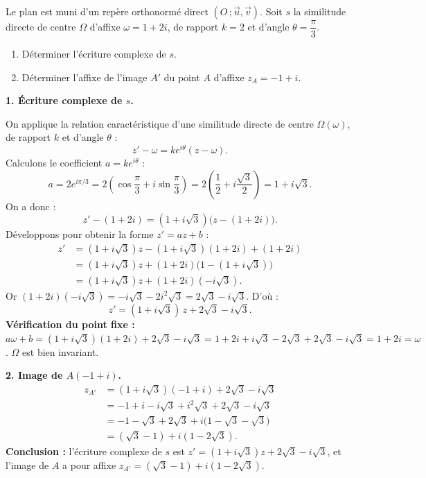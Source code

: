 \documentclass[11pt]{article}
\begin{document}
\begin{exoresolu}
Le plan est muni d'un repère orthonormé direct $(O\,;\vec{u},\vec{v})$. Soit $s$ la similitude directe de centre $\Omega$ d'affixe $\omega = 1 + 2i$, de rapport $k = 2$ et d'angle $\theta = \dfrac{\pi}{3}$.
\begin{enumerate}
\item Déterminer l'écriture complexe de $s$.
\item Déterminer l'affixe de l'image $A'$ du point $A$ d'affixe $z_A = -1 + i$.
\end{enumerate}
\tcblower
\textbf{1. Écriture complexe de $s$.}

On applique la relation caractéristique d'une similitude directe de centre $\Omega(\omega)$, de rapport $k$ et d'angle $\theta$ :
\[ z' - \omega = k e^{i\theta}(z - \omega). \]
Calculons le coefficient $a = k e^{i\theta}$ :
\[ a = 2 e^{i\pi/3} = 2\left(\cos\frac{\pi}{3} + i\sin\frac{\pi}{3}\right) = 2\left(\frac{1}{2} + i\frac{\sqrt{3}}{2}\right) = 1 + i\sqrt{3}. \]
On a donc :
\[ z' - (1 + 2i) = (1 + i\sqrt{3})\bigl(z - (1+2i)\bigr). \]
Développons pour obtenir la forme $z' = az + b$ :
\begin{align*}
z' &= (1 + i\sqrt{3})z - (1+i\sqrt{3})(1+2i) + (1+2i) \\
&= (1 + i\sqrt{3})z + (1+2i)\bigl(1 - (1+i\sqrt{3})\bigr) \\
&= (1 + i\sqrt{3})z + (1+2i)(-i\sqrt{3}).
\end{align*}
Or $(1+2i)(-i\sqrt{3}) = -i\sqrt{3} - 2i^2\sqrt{3} = 2\sqrt{3} - i\sqrt{3}$. D'où :
\[ \boxed{z' = (1 + i\sqrt{3})\,z + 2\sqrt{3} - i\sqrt{3}}. \]
\textbf{Vérification du point fixe :} $a\omega + b = (1+i\sqrt{3})(1+2i) + 2\sqrt{3} - i\sqrt{3} = 1 + 2i + i\sqrt{3} - 2\sqrt{3} + 2\sqrt{3} - i\sqrt{3} = 1 + 2i = \omega$. $\Omega$ est bien invariant.

\textbf{2. Image de $A(-1+i)$.}
\begin{align*}
z_{A'} &= (1 + i\sqrt{3})(-1 + i) + 2\sqrt{3} - i\sqrt{3} \\
&= -1 + i - i\sqrt{3} + i^2\sqrt{3} + 2\sqrt{3} - i\sqrt{3} \\
&= -1 - \sqrt{3} + 2\sqrt{3} + i\bigl(1 - \sqrt{3} - \sqrt{3}\bigr) \\
&= (\sqrt{3} - 1) + i(1 - 2\sqrt{3}).
\end{align*}
\textbf{Conclusion :} l'écriture complexe de $s$ est $z' = (1+i\sqrt{3})z + 2\sqrt{3} - i\sqrt{3}$, et l'image de $A$ a pour affixe $z_{A'} = (\sqrt{3}-1) + i(1 - 2\sqrt{3})$.
\end{exoresolu}
\end{document}
